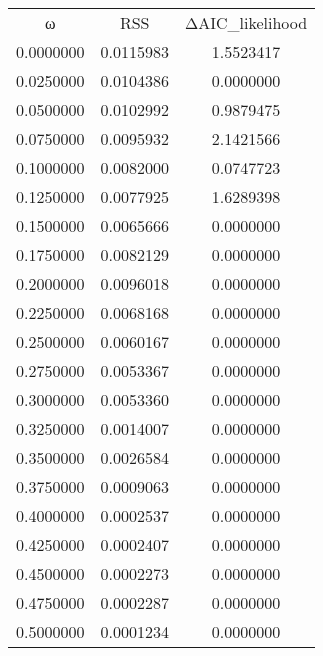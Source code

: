 \begin{tabular}{ccc}
ω & RSS & ΔAIC_likelihood\\
0.0000000 & 0.0115983 & 1.5523417\\
0.0250000 & 0.0104386 & 0.0000000\\
0.0500000 & 0.0102992 & 0.9879475\\
0.0750000 & 0.0095932 & 2.1421566\\
0.1000000 & 0.0082000 & 0.0747723\\
0.1250000 & 0.0077925 & 1.6289398\\
0.1500000 & 0.0065666 & 0.0000000\\
0.1750000 & 0.0082129 & 0.0000000\\
0.2000000 & 0.0096018 & 0.0000000\\
0.2250000 & 0.0068168 & 0.0000000\\
0.2500000 & 0.0060167 & 0.0000000\\
0.2750000 & 0.0053367 & 0.0000000\\
0.3000000 & 0.0053360 & 0.0000000\\
0.3250000 & 0.0014007 & 0.0000000\\
0.3500000 & 0.0026584 & 0.0000000\\
0.3750000 & 0.0009063 & 0.0000000\\
0.4000000 & 0.0002537 & 0.0000000\\
0.4250000 & 0.0002407 & 0.0000000\\
0.4500000 & 0.0002273 & 0.0000000\\
0.4750000 & 0.0002287 & 0.0000000\\
0.5000000 & 0.0001234 & 0.0000000\\
\end{tabular}
